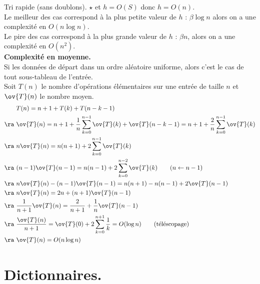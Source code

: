 \documentclass[french, 11pt]{article}
\begin{document}
\begin{defi}{Tri rapide (sans doublons). $\star$}{}
    et $h=O(S)$ donc $h=O(n)$.\\
    Le meilleur des cas correspond à la plus petite valeur de $h$ : $\beta\log n$ alors on a une complexité en $O(n\log n)$.\\
    Le pire des cas correspond à la plus grande valeur de $h$ : $\beta n$, alors on a une complexité en $O(n^2)$.\\
    \textbf{Complexité en moyenne.}\\
    Si les données de départ dans un ordre aléatoire uniforme, alors c'est le cas de tout sous-tableau de l'entrée.\\
    Soit $T(n)$ le nombre d'opérations élémentaires sur une entrée de taille $n$ et $\ov{T}(n)$ le nombre moyen.
    \begin{align*}
        &T(n) = n + 1 + T(k) + T(n - k - 1)\\
        \ra~&\ov{T}(n) = n+1+\frac{1}{n}\sum_{k=0}^{n-1}{\ov{T}(k)+\ov{T}(n-k-1)}=n+1+\frac{2}{n}\sum_{k=0}^{n-1}\ov{T}(k)\\
        \ra~&n\ov{T}(n) = n(n+1) + 2\sum_{k=0}^{n-1}\ov{T}(k)\\
        \ra~&(n-1)\ov{T}(n-1)=n(n-1) + 2\sum_{k=0}^{n-2}\ov{T}(k) \qquad (n \gets n-1)\\
        \ra~&n\ov{T}(n) - (n-1)\ov{T}(n-1) = n(n+1) - n(n-1)+2\ov{T}(n-1)\\
        \ra~&n\ov{T}(n) = 2n +(n+1)\ov{T}(n-1)\\
        \ra~&\frac{1}{n+1}\ov{T}(n)=\frac{2}{n+1}+\frac{1}{n}\ov{T}(n-1)\\
        \ra~&\frac{\ov{T}(n)}{n+1}=\ov{T}(0) + 2\sum_{k=0}^{n+1}\frac{1}{k} = O(\log n) \qquad \text{(téléscopage)}\\
        \ra~&\ov{T}(n)=O(n\log n)
    \end{align*}
\end{defi}

\section{Dictionnaires.}
\end{document}
